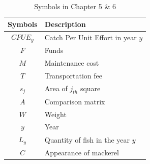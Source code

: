 \documentclass{mcmthesis}
\begin{document}
\begin{table}[htbp]
\centering
\caption{Symbols in Chapter 5 \& 6}
\begin{tabular}{cp{}}
\toprule
 Symbols & Description\\
\midrule
$CPUE_{y}$ & Catch Per Unit Effort in year $y$\\
$F$  & Funds\\
$M$  & Maintenance cost\\
$T$  & Transportation fee\\ 
$s_{j}$  & Area of $j_{th}$ square\\
$A $  & Comparison matrix\\
$W$ & Weight\\
$y$ & Year\\
$L_{y}$ & Quantity of fish in the year $y$\\
$C$ &  Appearance of mackerel\\  
\bottomrule
\end{tabular}
\end{table}
\end{document}
